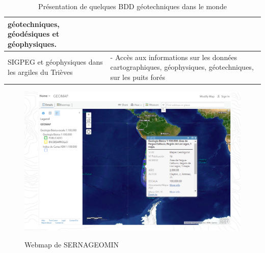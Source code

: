 \begin{table}
\begin{tabular}{|p{0.40\linewidth}|p{0.60\linewidth}|}
                        géotechniques, géodésiques et géophysiques.
                       \\
                \hline 
                SIGPEG
                et géophysiques dans les argiles du Trièves&
                        - Accès aux informations sur les données
                        cartographiques, géophysiques, géotechniques, sur les puits forés
                            \\
                \hline 
        \end{tabular}
        \caption{Présentation de quelques BDD géotechniques dans le monde} \label{tab:someBDD}
\end{table}
\par

\begin{figure}[t]
    \centering
    \includegraphics[width=1\textwidth]{images/Contexte/chili.png}
    \caption{Webmap de SERNAGEOMIN }\cite{map2}
    \label{fig:chili}
\end{figure}

